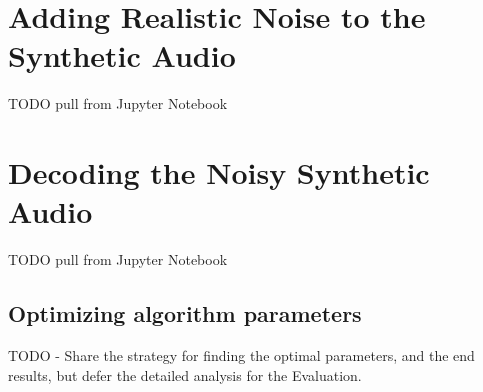 \section{Adding Realistic Noise to the Synthetic Audio}
\label{sec:adding-realistic-noise}

TODO pull from Jupyter Notebook


\section{Decoding the Noisy Synthetic Audio}
\label{sec:decoding-realistic-noise}

TODO pull from Jupyter Notebook

\subsection{Optimizing algorithm parameters}
TODO - Share the strategy for finding the optimal parameters, and the end results, but defer the detailed analysis for the Evaluation.
